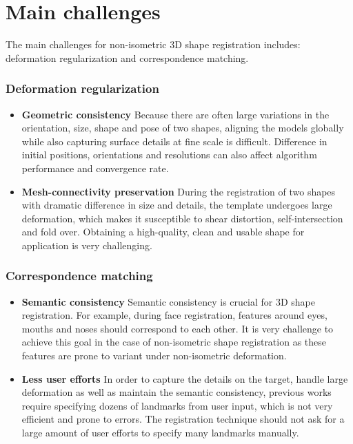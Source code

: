 \section{Main challenges}

The main challenges for non-isometric 3D shape registration includes: deformation regularization and correspondence matching.

\subsubsection{Deformation regularization}
\begin{itemize}
\item \textbf{Geometric consistency} Because there are often large variations in the orientation, size, shape and pose of two shapes, aligning the models globally while also capturing surface details at fine scale is difficult. Difference in initial positions, orientations and resolutions can also affect algorithm performance and convergence rate.

\item \textbf{Mesh-connectivity preservation} During the registration of two shapes with dramatic difference in size and details, the template undergoes large deformation, which makes it susceptible to shear distortion, self-intersection and fold over. Obtaining a high-quality, clean and usable shape for application is very challenging.
\end{itemize}


\subsubsection{Correspondence matching}
\begin{itemize}

\item \textbf{Semantic consistency}
Semantic consistency is crucial for 3D shape registration. For example, during face registration, features around eyes, mouths and noses should correspond to each other. It is very challenge to achieve this goal in the case of non-isometric shape registration as these features are prone to variant under non-isometric deformation.

\item \textbf{Less user efforts}
In order to capture the details on the target, handle large deformation as well as maintain the semantic consistency, previous works require specifying dozens of landmarks from user input, which is not very efficient and prone to errors. The registration technique should not ask for a large amount of user efforts to specify many landmarks manually.

\end{itemize}


